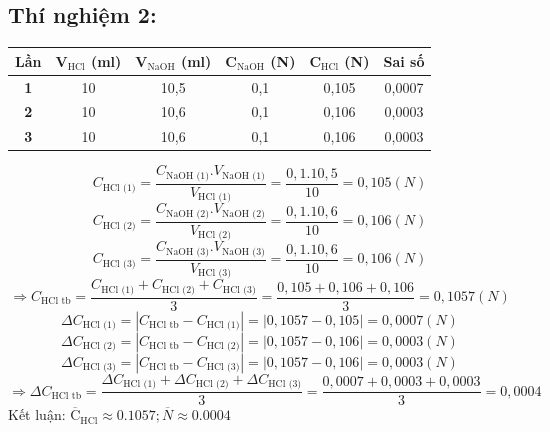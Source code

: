 \documentclass[12pt,a4paper]{report}
\begin{document}
\subsection*{Thí nghiệm 2:} 
\begin{table}[h!]
    \centering
    \begin{tabular}{|c|c|c|c|c|c|}
    \hline
    \textbf{Lần} & \textbf{V$_\text{HCl}$ (ml)} & \textbf{V$_\text{NaOH}$ (ml)} & \textbf{C$_\text{NaOH}$ (N)} & \textbf{C$_\text{HCl}$ (N)} & \textbf{Sai số} \\ \hline
    \textbf{1}   & 10                           & 10,5                          & 0,1                          & 0,105                       & 0,0007          \\ \hline
    \textbf{2}   & 10                           & 10,6                          & 0,1                          & 0,106                       & 0,0003          \\ \hline
    \textbf{3}   & 10                           & 10,6                          & 0,1                          & 0,106                       & 0,0003          \\ \hline
    \end{tabular}
    \end{table}
\[
    C_\text{HCl (1)} = \frac{C_\text{NaOH (1)}.V_\text{NaOH (1)}}{V_\text{HCl (1)}} = \frac{0,1.10,5}{10} = 0,105 (N)
\]
\[
    C_\text{HCl (2)} = \frac{C_\text{NaOH (2)}.V_\text{NaOH (2)}}{V_\text{HCl (2)}} = \frac{0,1.10,6}{10} = 0,106 (N)
\]
\[
    C_\text{HCl (3)} = \frac{C_\text{NaOH (3)}.V_\text{NaOH (3)}}{V_\text{HCl (3)}} = \frac{0,1.10,6}{10} = 0,106 (N)
\]
\[
    \Rightarrow C_\text{HCl tb} = \frac{C_\text{HCl (1)}+C_\text{HCl (2)}+C_\text{HCl (3)}}{3} = \frac{0,105 + 0,106+0,106}{3} = 0,1057 (N)
\]
\[
    \Delta C_\text{HCl (1)} = |C_\text{HCl tb} - C_\text{HCl (1)}| = |0,1057 - 0,105| = 0,0007 (N)
\]
\[
    \Delta C_\text{HCl (2)} = |C_\text{HCl tb} - C_\text{HCl (2)}| = |0,1057 - 0,106| = 0,0003 (N)
\]
\[
    \Delta C_\text{HCl (3)} = |C_\text{HCl tb}- C_\text{HCl (3)}| = |0,1057 - 0,106| = 0,0003 (N)
\]
\[
    \Rightarrow \Delta C_\text{HCl tb} = \frac{\Delta C_\text{HCl (1)}+\Delta C_\text{HCl (2)}+\Delta C_\text{HCl (3)}}{3} = \frac{0,0007 +0,0003 + 0,0003}{3} = 0,0004
\]
Kết luận: \( \overline{\text{C}}_{\text{HCl}} \approx 0.1057; \overline{N} \approx 0.0004 \)
\end{document}
